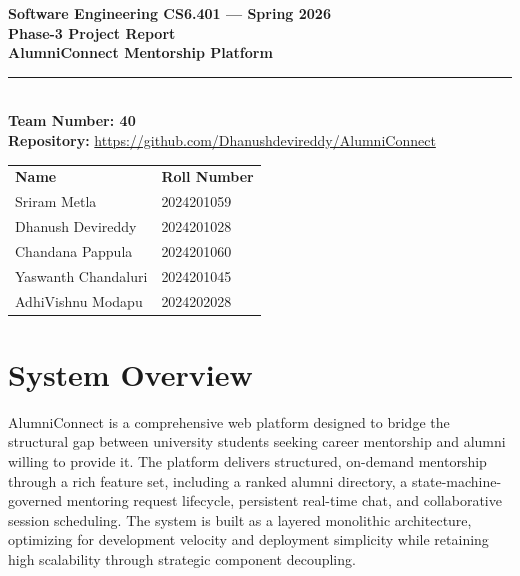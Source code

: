\documentclass[12pt,a4paper]{article}
\begin{document}
\begin{titlepage}
  \centering
  \vspace*{2cm}
  {\Large\bfseries Software Engineering CS6.401 --- Spring 2026}\\[0.4cm]
  {\huge\bfseries Phase-3 Project Report}\\[1.2cm]
  {\Large\bfseries\color{accentblue} AlumniConnect Mentorship Platform}\\[1.2cm]
  \rule{\textwidth}{0.5pt}\\[1cm]
  {\Large \textbf{Team Number: 40}}\\[0.8cm]
  {\large \textbf{Repository:} \url{https://github.com/Dhanushdevireddy/AlumniConnect}}\\[0.8cm]
  
  
  \renewcommand{\arraystretch}{1.5}
  \begin{tabular}{ll}
    \textbf{Name} & \textbf{Roll Number} \\
    Sriram Metla & 2024201059 \\
    Dhanush Devireddy & 2024201028 \\
    Chandana Pappula & 2024201060 \\
    Yaswanth Chandaluri & 2024201045 \\
    AdhiVishnu Modapu & 2024202028 \\
  \end{tabular}
  
  \vfill
\end{titlepage}

\tableofcontents
\newpage

\section*{System Overview}

AlumniConnect is a comprehensive web platform designed to bridge the structural gap between university students seeking career mentorship and alumni willing to provide it. The platform delivers structured, on-demand mentorship through a rich feature set, including a ranked alumni directory, a state-machine-governed mentoring request lifecycle, persistent real-time chat, and collaborative session scheduling. The system is built as a layered monolithic architecture, optimizing for development velocity and deployment simplicity while retaining high scalability through strategic component decoupling.
\end{document}
